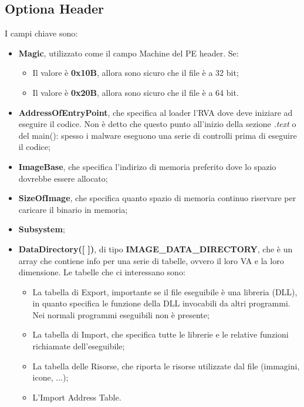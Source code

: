 \documentclass[a4paper]{book}
\begin{document}
\subsection{Optiona Header}
I campi chiave sono:
\begin{itemize}
    \item \textbf{Magic}, utilizzato come il campo Machine del PE header. Se:
        \begin{itemize}
            \item Il valore è \textbf{0x10B}, allora sono sicuro che il file è a 32 bit;
            \item Il valore è \textbf{0x20B}, allora sono sicuro che il file è a 64 bit.
        \end{itemize}
    \item \textbf{AddressOfEntryPoint}, che specifica al loader l'RVA dove deve iniziare ad eseguire il codice. Non è detto che questo punto all'inizio della sezione \textit{.text} o del main(): spesso i malware eseguono una serie di controlli prima di eseguire il codice;
    \item \textbf{ImageBase}, che specifica l'indirizo di memoria preferito dove lo spazio dovrebbe essere allocato;
    \item \textbf{SizeOfImage}, che specifica quanto spazio di memoria continuo riservare per caricare il binario in memoria;
    \item \textbf{Subsystem};
    \item \textbf{DataDirectory([ ])}, di tipo \textbf{IMAGE\_DATA\_DIRECTORY}, che è un array che contiene info per una serie di tabelle, ovvero il loro VA e la loro dimensione. Le tabelle che ci interessano sono:
    \begin{itemize}
        \item La tabella di Export, importante se il file eseguibile è una libreria (DLL), in quanto specifica le funzione della DLL invocabili da altri programmi. Nei normali programmi eseguibili non è presente;
        \item La tabella di Import, che specifica tutte le librerie e le relative funzioni richiamate dell'eseguibile;
        \item La tabella delle Risorse, che riporta le risorse utilizzate dal file (immagini, icone, ...);
        \item L'Import Address Table. 
    \end{itemize}
\end{itemize}
\end{document}

